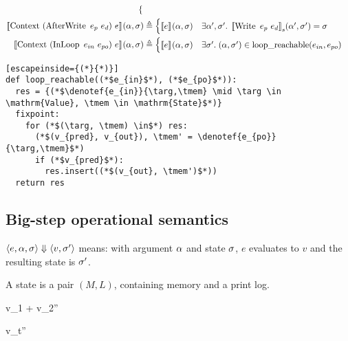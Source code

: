 \begin{align*}
\begin{cases}
\end{cases}\\
%
\denotef{\bop{Context}{(\bop{AfterWrite}{e_p}{e_d})}{e}}{\targ,\tmem} &\eqdef
\begin{cases}
  \denotef{e}{\targ,\tmem} & \exists \targ', \tmem' . \; \denotefs{\bop{Write}{e_p}{e_d}}{\targ',\tmem'} = \tmem
\end{cases}\\
%
\denotef{\bop{Context}{(\bop{InLoop}{e_{in}}{e_{po}})}{e}}{\targ,\tmem} &\eqdef
\begin{cases}
  \denotef{e}{\targ,\tmem} &
    \exists  \tmem' . \; (\targ,\tmem') \in  \operatorname{loop\_reachable}(e_{in},e_{po})
\end{cases}
\end{align*}
\begin{lstlisting}[escapeinside={(*}{*)}]
def loop_reachable((*$e_{in}$*), (*$e_{po}$*)):
  res = {(*$\denotef{e_{in}}{\targ,\tmem} \mid \targ \in \mathrm{Value}, \tmem \in \mathrm{State}$*)}
  fixpoint:
    for (*$(\targ, \tmem) \in$*) res:
      (*$(v_{pred}, v_{out}), \tmem' = \denotef{e_{po}}{\targ,\tmem}$*)
      if (*$v_{pred}$*):
        res.insert((*$(v_{out}, \tmem')$*))
  return res
\end{lstlisting}


\newpage

\subsection*{Big-step operational semantics}

$\langle e, \alpha, \sigma \rangle \Downarrow \langle v, \sigma' \rangle$ means: with argument $\alpha$ and state $\sigma$, $e$ evaluates to $v$ and the resulting state is $\sigma'$.

A state is a pair $(M, L)$, containing memory and a print log.



{\easvsd
  {}{\targ}{\tmem}
  {v_1 + v_2}{\tmem''}}

{\easvsd
  {}{\targ}{\tmem}
  {v_t}{\tmem''}}

